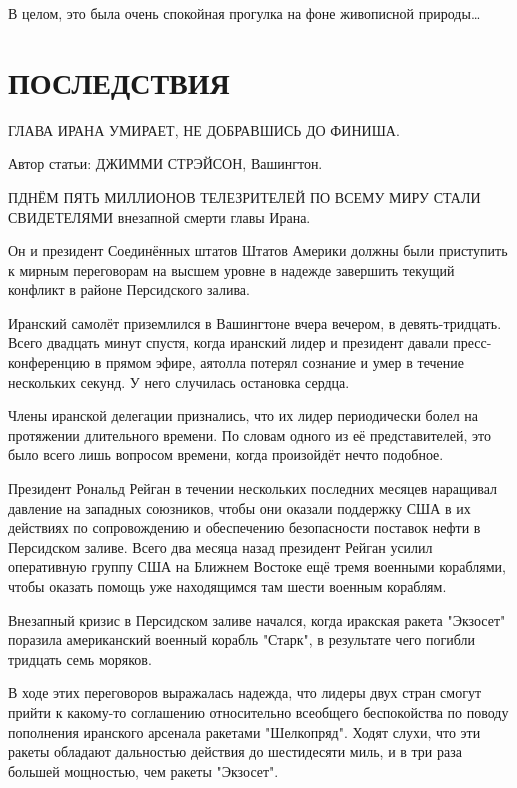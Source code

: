 \documentclass[a5paper, 9pt,
final, openany, twoside=true]{memoir}
\begin{document}
В целом, это была очень спокойная прогулка на фоне живописной природы…
\chapter{ПОСЛЕДСТВИЯ}
\begin{center}
ГЛАВА ИРАНА УМИРАЕТ, НЕ ДОБРАВШИСЬ ДО ФИНИША.\bigskip
\end{center}

\begin{center}
Автор статьи: ДЖИММИ СТРЭЙСОН, Вашингтон.\bigskip
\end{center}

П{ ДНЁМ ПЯТЬ МИЛЛИОНОВ ТЕЛЕЗРИТЕЛЕЙ ПО ВСЕМУ МИРУ СТАЛИ СВИДЕТЕЛЯМИ} внезапной смерти главы Ирана.

Он и президент Соединённых штатов Штатов Америки должны были приступить к мирным переговорам на высшем уровне в надежде завершить текущий конфликт в районе Персидского залива.\bigskip

Иранский самолёт приземлился в Вашингтоне вчера вечером, в девять-тридцать. Всего двадцать минут спустя, когда иранский лидер и президент давали пресс-конференцию в прямом эфире, аятолла потерял сознание и умер в течение нескольких секунд. У него случилась остановка сердца.\bigskip

Члены иранской делегации признались, что их лидер периодически болел на протяжении длительного времени. По словам одного из её представителей, это было всего лишь вопросом времени, когда произойдёт нечто подобное.\bigskip

Президент Рональд Рейган в течении нескольких последних месяцев наращивал давление на западных союзников, чтобы они оказали поддержку США в их действиях по сопровождению и обеспечению безопасности поставок нефти в Персидском заливе. Всего два месяца назад президент Рейган усилил оперативную группу США на Ближнем Востоке ещё тремя военными кораблями, чтобы оказать помощь уже находящимся там шести военным кораблям.\bigskip

Внезапный кризис в Персидском заливе начался, когда иракская ракета "Экзосет" поразила американский военный корабль "Старк", в результате чего погибли тридцать семь моряков.\bigskip

В ходе этих переговоров выражалась надежда, что лидеры двух стран смогут прийти к какому-то соглашению относительно всеобщего беспокойства по поводу пополнения иранского арсенала ракетами "Шелкопряд". Ходят слухи, что эти ракеты обладают дальностью действия до шестидесяти миль, и в три раза большей мощностью, чем ракеты "Экзосет".\bigskip
\end{document}
